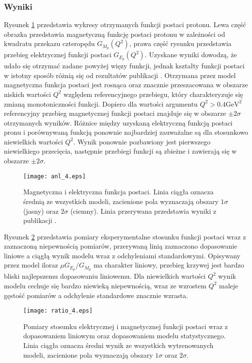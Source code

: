 \documentclass[11pt]{book}
\theoremstyle{definition}
\begin{document}
\subsubsection{Wyniki}

Rysunek \ref{fig:ff4} przedstawia wykresy otrzymanych funkcji postaci protonu. Lewa część obrazka przedstawia magnetyczną funkcję postaci protonu w zależności od kwadratu przekazu czteropędu $G_{M_p}\left(Q^2\right)$, prawa część rysunku przedstawia przebieg elektrycznej funkcji postaci $G_{E_p}\left(Q^2\right)$. Uzyskane wyniki dowodzą, że udało się otrzymać zadane powyżej więzy funkcji, jednak kształty funkcji postaci w istotny sposób różnią się od rezultatów publikacji \cite{2009PhRvC..79f5204A}. Otrzymana przez model magnetyczna funkcja postaci jest rosnąca oraz znacznie przeszacowana w obszarze niskich wartości $Q^2$ względem referencyjnego przebiegu, który charakteryzuje się zmianą monotoniczności funkcji. Dopiero dla wartości argumentu $Q^2 > 0.4 \text{GeV}^2$ referencyjny przebieg magnetycznej funkcji postaci znajduje się w obszarze $\pm 2\sigma$ otrzymanych wyników. Różnice między uzyskaną elektryczną funkcją postaci pronu i porównywaną funkcją ponownie najbardziej zauważalne są dla stosunkowo niewielkich wartości $Q^2$. Wynik ponownie pozbawiony jest pierwszego niewielkiego przecięcia, następnie przebiegi funkcji są zbieżne i zawierają się w obszarze $\pm 2\sigma$.


\begin{figure}[h!p!]
	\centering
	\texttt{[image: anl\_4.eps]}
	\caption{Magnetyczna i elektryczna funkcja postaci. Linia ciągła oznacza średnią ze wszystkich modeli, zacienione pola wyznaczają obszary $1 \sigma$ (jasny) oraz $2\sigma$ (ciemny). Linia przerywana przedstawia wyniki z publikacji \cite{2009PhRvC..79f5204A}. } 
	\label{fig:ff4}
\end{figure}

Rysunek \ref{fig:ratio4} przedstawia pomiary eksperymentalne stosunku funkcji postaci wraz z zaznaczoną niepewnością pomiarów, przerywaną linią zaznaczono dopasowanie liniowe a ciągłą wynik modelu wraz z odchyleniami standardowymi. Opisywany przez model iloraz $\mu G_{E_p} / G_{M_p}$ ma charakter liniowy, przebieg krzywej jest bardzo bliski najlepszemu dopasowaniu liniowemu.  Dla niewielkich wartości $Q^2$ wynik modelu cechuje się bardzo niewieką niepewnością, wraz ze wzrostem $Q^2$ maleje gęstość pomiarów a odchylenie standardowe znacznie wzrasta.


\begin{figure}[h!p!]
	\centering
	\texttt{[image: ratio\_4.eps]}
	\caption{Pomiary stosunku elektrycznej i magnetycznej funkcji postaci wraz z dopasowaniem liniowym oraz dopasowaniem modelu statystycznego. Linia ciągła oznacza średni wynik ze wszystkich wytrenowanych modeli, zacienione pola wyznaczają obszary $1 \sigma$ oraz $2\sigma$.} 
	\label{fig:ratio4}
\end{figure}
\end{document}
